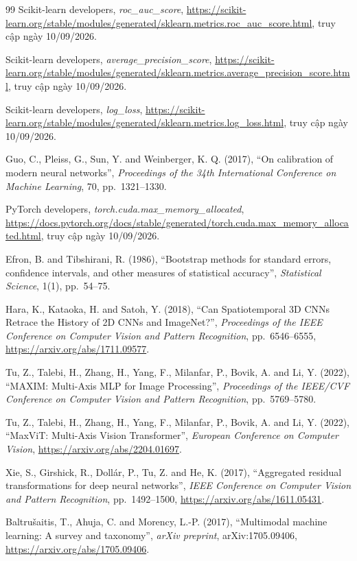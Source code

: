 \documentclass[14pt,a4paper,oneside]{extreport}
\begin{document}
\begin{thebibliography}{99}
Scikit-learn developers, \textit{roc\_auc\_score},
\url{https://scikit-learn.org/stable/modules/generated/sklearn.metrics.roc_auc_score.html},
truy cập ngày 10/09/2026.

Scikit-learn developers, \textit{average\_precision\_score},
\url{https://scikit-learn.org/stable/modules/generated/sklearn.metrics.average_precision_score.html},
truy cập ngày 10/09/2026.

Scikit-learn developers, \textit{log\_loss},
\url{https://scikit-learn.org/stable/modules/generated/sklearn.metrics.log_loss.html},
truy cập ngày 10/09/2026.

Guo, C., Pleiss, G., Sun, Y. and Weinberger, K. Q. (2017),
``On calibration of modern neural networks'', \textit{Proceedings of the
34th International Conference on Machine Learning}, 70, pp.~1321--1330.

PyTorch developers, \textit{torch.cuda.max\_memory\_allocated},
\url{https://docs.pytorch.org/docs/stable/generated/torch.cuda.max_memory_allocated.html},
truy cập ngày 10/09/2026.

Efron, B. and Tibshirani, R. (1986), ``Bootstrap methods for standard errors,
confidence intervals, and other measures of statistical accuracy'',
\textit{Statistical Science}, 1(1), pp.~54--75.

Hara, K., Kataoka, H. and Satoh, Y. (2018), ``Can Spatiotemporal 3D
CNNs Retrace the History of 2D CNNs and ImageNet?'',
\textit{Proceedings of the IEEE Conference on Computer Vision and
Pattern Recognition}, pp.~6546--6555,
\url{https://arxiv.org/abs/1711.09577}.

Tu, Z., Talebi, H., Zhang, H., Yang, F., Milanfar, P., Bovik, A. and
Li, Y. (2022), ``MAXIM: Multi-Axis MLP for Image Processing'',
\textit{Proceedings of the IEEE/CVF Conference on Computer Vision
and Pattern Recognition}, pp.~5769--5780.

Tu, Z., Talebi, H., Zhang, H., Yang, F., Milanfar, P., Bovik, A. and
Li, Y. (2022), ``MaxViT: Multi-Axis Vision Transformer'',
\textit{European Conference on Computer Vision},
\url{https://arxiv.org/abs/2204.01697}.

Xie, S., Girshick, R., Dollár, P., Tu, Z. and He, K. (2017),
``Aggregated residual transformations for deep neural networks'',
\textit{IEEE Conference on Computer Vision and Pattern Recognition},
pp.~1492--1500, \url{https://arxiv.org/abs/1611.05431}.

Baltrušaitis, T., Ahuja, C. and Morency, L.-P. (2017),
``Multimodal machine learning: A survey and taxonomy'',
\textit{arXiv preprint}, arXiv:1705.09406,
\url{https://arxiv.org/abs/1705.09406}.

\end{thebibliography}
\end{document}
